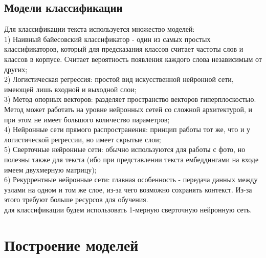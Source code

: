 \documentclass{article}
\newcommand\tab[1][1cm]{\hspace*{#1}}
\begin{document}
\subsection{Модели классификации}
\tab Для классификации текста используется множество моделей:\\
\tab\tab1) Наивный байесовский классификатор - один из самых простых классификаторов, который для предсказания классов считает частоты слов и классов в корпусе. Считает вероятность появления каждого слова независимым от других;\\
\tab\tab2) Логистическая регрессия: простой вид искусственной нейронной сети, имеющей лишь входной и выходной слои;\\
\tab\tab3) Метод опорных векторов: разделяет пространство векторов гиперплоскостью. Метод может работать на уровне нейронных сетей со сложной архитектурой, и при этом не имеет большого количество параметров;\\
\tab\tab4) Нейронные сети прямого распространения: принцип работы тот же, что и у логистической регрессии, но имеет скрытые слои;\\
\tab\tab5) Сверточные нейронные сети: обычно используются для работы с фото, но полезны также для текста (ибо при представлении текста ембеддингами на входе имеем двухмерную матрицу);\\
\tab\tab6) Рекуррентные нейронные сети: главная особенность - передача данных между узлами на одном и том же слое, из-за чего возможно сохранять контекст. Из-за этого требуют больше ресурсов для обучения.\\
 для классификации будем использовать 1-мерную сверточную нейронную сеть.\\
\section{Построение моделей} 
\end{document}
